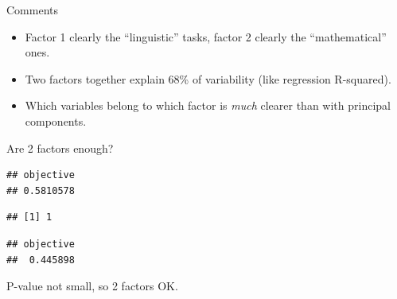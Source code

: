 \documentclass[ignorenonframetext,]{beamer}
\newenvironment{Shaded}{\begin{snugshade}}{\end{snugshade}}
\newcommand{\NormalTok}[1]{#1}
\newcommand{\OperatorTok}[1]{\textcolor[rgb]{0.81,0.36,0.00}{\textbf{#1}}}
\begin{document}
\begin{frame}{Comments}
\protect\hypertarget{comments-33}{}

\begin{itemize}
\item
  Factor 1 clearly the ``linguistic'' tasks, factor 2 clearly the
  ``mathematical'' ones.
\item
  Two factors together explain 68\% of variability (like regression
  R-squared).
\item
  Which variables belong to which factor is \emph{much} clearer than
  with principal components.
\end{itemize}

\end{frame}

\begin{frame}[fragile]{Are 2 factors enough?}
\protect\hypertarget{are-2-factors-enough}{}

\begin{Shaded}
\end{Shaded}

\begin{verbatim}
## objective 
## 0.5810578
\end{verbatim}

\begin{Shaded}
\end{Shaded}

\begin{verbatim}
## [1] 1
\end{verbatim}

\begin{Shaded}
\end{Shaded}

\begin{verbatim}
## objective 
##  0.445898
\end{verbatim}

P-value not small, so 2 factors OK.

\end{frame}
\end{document}

